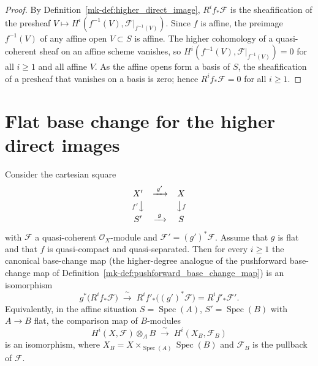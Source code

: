 \begin{proof}
  By Definition~\ref{mk-def:higher_direct_image}, \(R^i f_*\mathcal{F}\) is the
  sheafification of the presheaf \(V \mapsto H^i(f^{-1}(V),
  \mathcal{F}|_{f^{-1}(V)})\). Since \(f\) is affine, the preimage \(f^{-1}(V)\) of
  any affine open \(V \subset S\) is affine. The higher cohomology of a
  quasi-coherent sheaf on an affine scheme vanishes, so
  \(H^i(f^{-1}(V), \mathcal{F}|_{f^{-1}(V)}) = 0\) for all \(i \geq 1\) and all
  affine \(V\). As the affine opens form a basis of \(S\), the sheafification of a
  presheaf that vanishes on a basis is zero; hence \(R^i f_*\mathcal{F} = 0\) for
  all \(i \geq 1\).
\end{proof}

\section{Flat base change for the higher direct images}

\begin{theorem}
  \label{mk-thm:flat_base_change_higher}
  Consider the cartesian square
  \[
    \begin{array}{ccc}
      X' & \xrightarrow{\;g'\;} & X \\[2pt]
      {\scriptstyle f'}\big\downarrow & & \big\downarrow{\scriptstyle f} \\[2pt]
      S' & \xrightarrow{\;g\;} & S
    \end{array}
  \]
  with \(\mathcal{F}\) a quasi-coherent \(\mathcal{O}_X\)-module and
  \(\mathcal{F}' = (g')^*\mathcal{F}\). Assume that \(g\) is flat and that \(f\) is
  quasi-compact and quasi-separated. Then for every \(i \geq 1\) the canonical
  base-change map (the higher-degree analogue of the pushforward base-change map
  of Definition~\ref{mk-def:pushforward_base_change_map}) is an isomorphism
  \[
    g^*\bigl(R^i f_*\mathcal{F}\bigr) \;\xrightarrow{\;\sim\;}\;
    R^i f'_*\bigl((g')^*\mathcal{F}\bigr) = R^i f'_*\mathcal{F}' .
  \]
  Equivalently, in the affine situation \(S = \operatorname{Spec}(A)\),
  \(S' = \operatorname{Spec}(B)\) with \(A \to B\) flat, the comparison map of
  \(B\)-modules
  \[
    H^i(X, \mathcal{F}) \otimes_A B \;\xrightarrow{\;\sim\;}\;
    H^i(X_B, \mathcal{F}_B)
  \]
  is an isomorphism, where \(X_B = X \times_{\operatorname{Spec}(A)}
  \operatorname{Spec}(B)\) and \(\mathcal{F}_B\) is the pullback of
  \(\mathcal{F}\).
\end{theorem}

